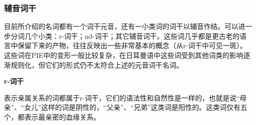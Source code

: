 \subsubsection{辅音词干}\label{辅音词干}

目前所介绍的名词都有一个词干元音，还有一小类词的词干以辅音作结。可以进一步分词几个小类：r-词干；nd-词干；其它辅音词干。这些词几乎都是更古老的语言中保留下来的产物，往往反映出一些非常基本的概念（从r-词干中可见一斑）。这些词在PIE中的变形一般比较复杂，在日耳曼语中这些词受到其他词类的影响逐渐规则化，但它们的形式仍不太符合上述的元音词干名词。

\textbf{r-词干}

表示亲属关系的词都属于r-词干，它们的语法性和自然性是一样的，也就是说``母亲''、``女儿''这样的词是阴性的，``父亲''、``兄弟''这类词是阳性的。这类词仅有五个，都表示最亲密的血缘关系。

